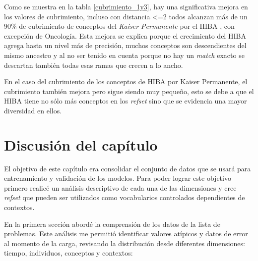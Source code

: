 Como se muestra en la tabla \ref{cubrimiento_1y3}, hay una significativa mejora en los valores de cubrimiento, incluso con distancia \textless=2 todos alcanzan más de un 90\% de cubrimiento de conceptos del \textit{Kaiser Permanente} por el \acrshort{HIBA} , con excepción de Oncología. Esta mejora se explica porque el crecimiento del \acrshort{HIBA} agrega hasta un nivel más de precisión, muchos conceptos son descendientes del mismo ancestro y al no ser tenido en cuenta porque no hay un \textit{match} exacto se descartan también todas esas ramas que crecen a lo ancho.

En el caso del cubrimiento de los conceptos de \acrshort{HIBA} por {Kaiser Permanente}, el cubrimiento también mejora pero sigue siendo muy pequeño, esto se debe a que el  \acrshort{HIBA} tiene no sólo más conceptos en los \textit{\acrshort{refset}}  sino que se evidencia una mayor diversidad en ellos.
 
\section{Discusión del capítulo}
El objetivo de este capítulo era consolidar el conjunto de datos que se usará para entrenamiento y validación de los modelos. Para poder lograr este objetivo primero realicé un análisis descriptivo de cada una de las dimensiones y cree \textit{\acrshort{refset}} que pueden ser utilizados como vocabularios controlados dependientes de contextos.

En la primera sección abordé la comprensión de los datos de la lista de problemas. Este análisis me permitió identificar valores atípicos y datos de error al momento de la carga, revisando la distribución desde diferentes dimensiones: tiempo, individuos, conceptos y contextos: 

